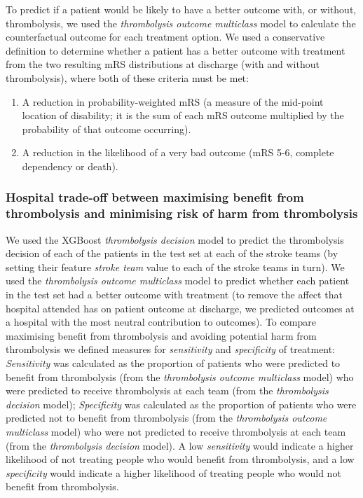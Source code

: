 To predict if a patient would be likely to have a better outcome with, or without, thrombolysis, we used the \textit{thrombolysis outcome multiclass} model to calculate the counterfactual outcome for each treatment option. We used a conservative definition to determine whether a patient has a better outcome with treatment from the two resulting mRS distributions at discharge (with and without thrombolysis), where both of these criteria must be met: 

\begin{enumerate}
    \item A reduction in probability-weighted mRS (a measure of the mid-point location of disability; it is the sum of each mRS outcome multiplied by the probability of that outcome occurring).
    \item A reduction in the likelihood of a very bad outcome (mRS 5-6, complete dependency or death).
\end{enumerate}

\subsubsection{Hospital trade-off between maximising benefit from thrombolysis and minimising risk of harm from thrombolysis}

We used the XGBoost \textit{thrombolysis decision} model to predict the thrombolysis decision of each of the patients in the test set at each of the stroke teams (by setting their feature \textit{stroke team} value to each of the stroke teams in turn). We used the \textit{thrombolysis outcome multiclass} model to predict whether each patient in the test set had a better outcome with treatment (to remove the affect that hospital attended has on patient outcome at discharge, we predicted outcomes at a hospital with the most neutral contribution to outcomes). To compare maximising benefit from thrombolysis and avoiding potential harm from thrombolysis we defined measures for \textit{sensitivity} and \textit{specificity} of treatment: \textit{Sensitivity} was calculated as the proportion of patients who were predicted to benefit from thrombolysis (from the \textit{thrombolysis outcome multiclass} model) who were predicted to receive thrombolysis at each team (from the \textit{thrombolysis decision} model); \textit{Specificity} was calculated as the proportion of patients who were predicted not to benefit from thrombolysis (from the \textit{thrombolysis outcome multiclass} model) who were not predicted to receive thrombolysis at each team (from the \textit{thrombolysis decision} model). A low \textit{sensitivity} would indicate a higher likelihood of not treating people who would benefit from thrombolysis, and a low \textit{specificity} would indicate a higher likelihood of treating people who would not benefit from thrombolysis.

